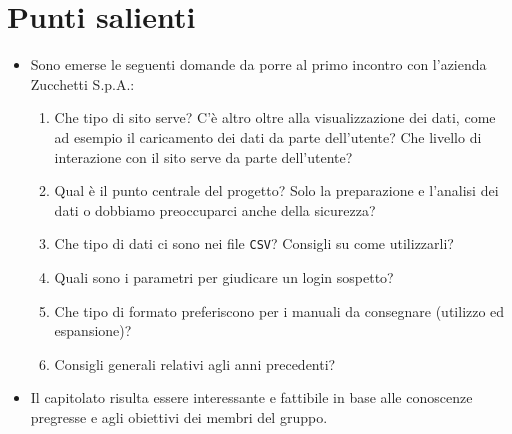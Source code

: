 \documentclass[11pt]{article}
\begin{document}
	\newpage

	\section{Punti salienti}
		\begin{itemize}
			\item Sono emerse le seguenti domande da porre al primo incontro con l'azienda Zucchetti S.p.A.:
			\begin{enumerate}
				\item Che tipo di sito serve?
				C'è altro oltre alla visualizzazione dei dati, come ad esempio il caricamento dei dati da parte dell'utente?
				Che livello di interazione con il sito serve da parte dell'utente?
				\item Qual è il punto centrale del progetto?
				Solo la preparazione e l'analisi dei dati o dobbiamo preoccuparci anche della sicurezza?
				\item Che tipo di dati ci sono nei file \texttt{CSV}? Consigli su come utilizzarli?
				\item Quali sono i parametri per giudicare un login sospetto?
				\item Che tipo di formato preferiscono per i manuali da consegnare (utilizzo ed espansione)?
				\item Consigli generali relativi agli anni precedenti?
			\end{enumerate}
			\item Il capitolato risulta essere interessante e fattibile in base alle conoscenze pregresse e agli
			obiettivi dei membri del gruppo.
		\end{itemize}
		
\end{document}
